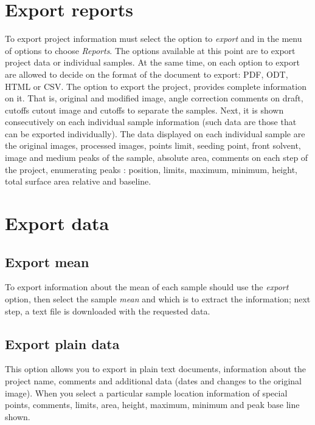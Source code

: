 \section{Export reports}
To export project information must select the option to \emph{export} and in the menu of options to choose \emph{Reports}. The options available at this point are to export project data or individual samples. At the same time, on each option to export are allowed to decide on the format of the document to export: PDF, ODT, HTML or CSV.
The option to export the project, provides complete information on it. That is, original and modified image, angle correction comments on draft, cutoffs cutout image and cutoffs to separate the samples. Next, it is shown consecutively on each individual sample information (such data are those that can be exported individually). The data displayed on each individual sample are the original images, processed images, points limit, seeding point, front solvent, image and medium peaks of the sample, absolute area, comments on each step of the project, enumerating peaks : position, limits, maximum, minimum, height, total surface area relative and baseline.
\section{Export data}
\subsection{Export mean}
To export information about the mean of each sample should use the \emph{export} option, then select the sample \emph{mean} and which is to extract the information; next step, a text file is downloaded with the requested data.

\subsection{Export plain data}
This option allows you to export in plain text documents, information about the project name, comments and additional data (dates and changes to the original image). When you select a particular sample location information of special points, comments, limits, area, height, maximum, minimum and peak base line shown.